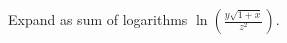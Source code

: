 \begin{frame}
\begin{example}
Expand as sum of logarithms $\ln \left(\frac{y\sqrt{1+x}}{z^2}\right)$.
\end{example}
\end{frame}